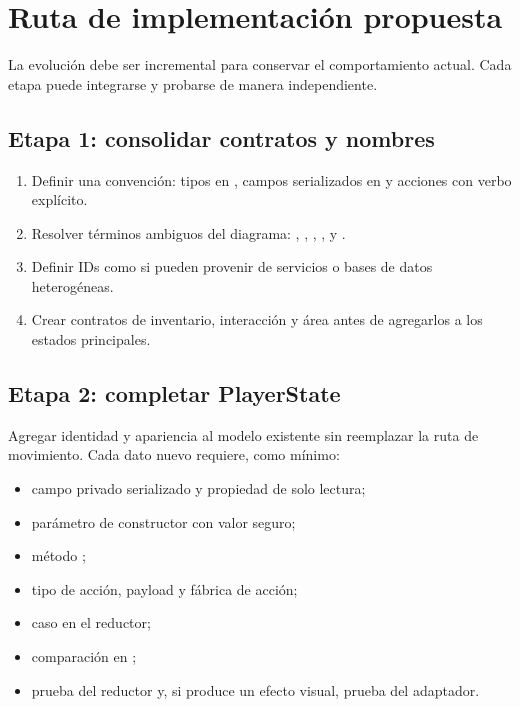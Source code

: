 \section{Ruta de implementación propuesta}

La evolución debe ser incremental para conservar el comportamiento actual. Cada etapa puede integrarse y probarse de manera independiente.

\subsection{Etapa 1: consolidar contratos y nombres}

\begin{enumerate}
  \item Definir una convención: tipos en , campos serializados en  y acciones con verbo explícito.
  \item Resolver términos ambiguos del diagrama: , , , ,  y .
  \item Definir IDs como  si pueden provenir de servicios o bases de datos heterogéneas.
  \item Crear contratos de inventario, interacción y área antes de agregarlos a los estados principales.
\end{enumerate}

\subsection{Etapa 2: completar PlayerState}

Agregar identidad y apariencia al modelo existente sin reemplazar la ruta de movimiento. Cada dato nuevo requiere, como mínimo:

\begin{itemize}
  \item campo privado serializado y propiedad de solo lectura;
  \item parámetro de constructor con valor seguro;
  \item método ;
  \item tipo de acción, payload y fábrica de acción;
  \item caso en el reductor;
  \item comparación en ;
  \item prueba del reductor y, si produce un efecto visual, prueba del adaptador.
\end{itemize}

